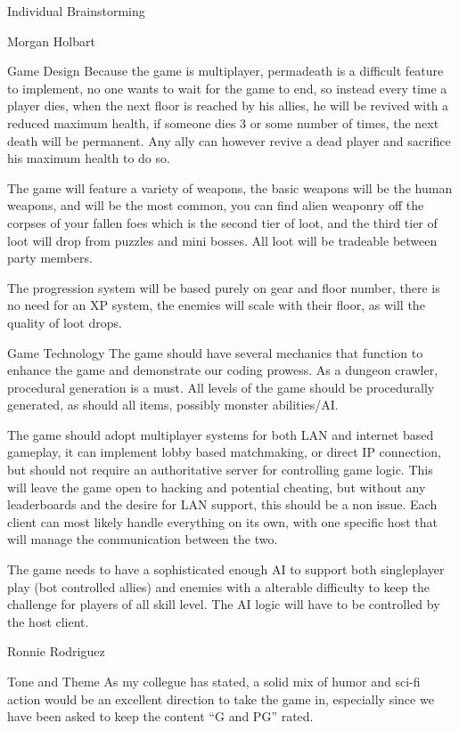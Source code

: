 \documentclass[12pt]{report}
\begin{document}
\begin{section}{Individual Brainstorming}
\begin{subsection}{Morgan Holbart}
\begin{subsubsection}{Game Design}
Because the game is multiplayer, permadeath is a difficult feature to
implement, no one wants to wait for the game to end, so instead every time a
player dies, when the next floor is reached by his allies, he will be
revived with a reduced maximum health, if someone dies 3 or some number of
times, the next death will be permanent. Any ally can however revive a dead
player and sacrifice his maximum health to do so.

The game will feature a variety of weapons, the basic weapons will be the
human weapons, and will be the most common, you can find alien weaponry off
the corpses of your fallen foes which is the second tier of loot, and the
third tier of loot will drop from puzzles and mini bosses. All loot will be
tradeable between party members.

The progression system will be based purely on gear and floor number, there
is no need for an XP system, the enemies will scale with their floor, as
will the quality of loot drops.
\end{subsubsection}

\begin{subsubsection}{Game Technology}
The game should have several mechanics that function to enhance the game and
demonstrate our coding prowess. As a dungeon crawler, procedural generation
is a must. All levels of the game should be procedurally generated, as
should all items, possibly monster abilities/AI.

The game should adopt multiplayer systems for both LAN and internet based
gameplay, it can implement lobby based matchmaking, or direct IP connection,
but should not require an authoritative server for controlling game logic. 
This will leave the game open to hacking and potential cheating, but without
any leaderboards and the desire for LAN support, this should be a non issue.
Each client can most likely handle everything on its own, with one specific
host that will manage the communication between the two.

The game needs to have a sophisticated enough AI to support both
singleplayer play (bot controlled allies) and enemies with a alterable
difficulty to keep the challenge for players of all skill level. The AI
logic will have to be controlled by the host client.
\end{subsubsection}
\end{subsection}

\begin{subsection}{Ronnie Rodriguez}
\begin{subsubsection}{Tone and Theme}
As my collegue has stated, a solid mix of humor and sci-fi action would be
an excellent direction to take the game in, especially since we have been
asked to keep the content ``G and PG'' rated. 


\end{subsubsection}
\end{subsection}
\end{section}
\end{document}
